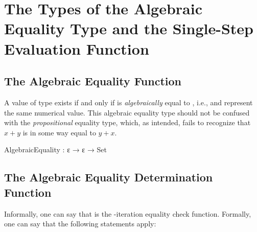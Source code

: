 \documentclass{report}
\begin{document}
\section{The Types of the Algebraic Equality Type and the Single-Step Evaluation Function}

\subsection{The Algebraic Equality Function}
A value of type    exists if and only if  is \emph{algebraically} equal to , i.e.,  and  represent the same numerical value.  This algebraic equality type should not be confused with the \emph{propositional} equality type, which, as intended, fails to recognize that \(x + y\) is in some way equal to \(y + x\).

\begin{code}
AlgebraicEquality : ε → ε → Set
\end{code}

\subsection{The Algebraic Equality Determination Function}
Informally, one can say that   is the -iteration equality check function. Formally, one can say that the following statements apply:
\end{document}
